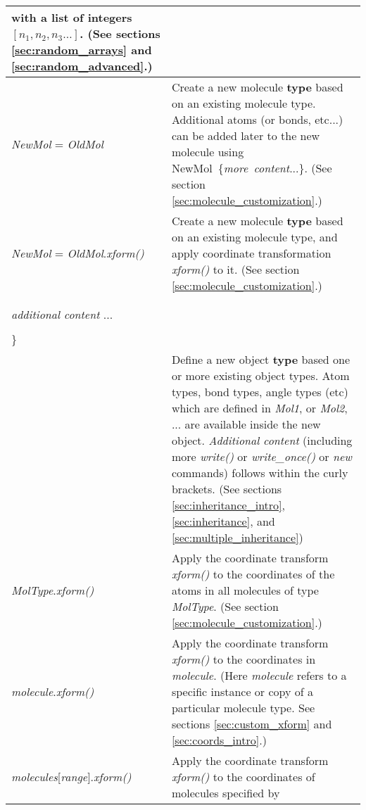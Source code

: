 \documentclass[11pt]{article}
\begin{document}
\begin{longtable}[h]{l|p{9cm}}
with a list of integers \mbox{$[n_1, n_2, n_3\ldots]$}.
(See sections \ref{sec:random_arrays} and \ref{sec:random_advanced}.)
\\
\hline
\textit{NewMol} = \textit{OldMol} &
Create a new molecule \textbf{type} based on an existing molecule type.
Additional atoms (or bonds, etc...) can be added later to the new molecule 
using \mbox{NewMol \{\textit{more\ content}...\}}.  
(See section \ref{sec:molecule_customization}.)
\\
\hline
\textit{NewMol} = \textit{OldMol}.\textit{xform()}
&
Create a new molecule \textbf{type} based on an existing molecule type,
and apply coordinate transformation \textit{xform()} to it.
(See section \ref{sec:molecule_customization}.)
\\
\hline
\begin{tabular}[t]{l}
\textit{NewMol} \textbf{inherits} \textit{Mol1} \textit{Mol2} ... \{ \\
\\
\hspace{0.35cm} \textit{additional content} ... \\
\\
\} \\
\end{tabular}
&
Define a new object \textbf{type}
based one or more existing object types.
Atom types, bond types, angle types (etc) which are defined in
\textit{Mol1}, or \textit{Mol2}, ... are available inside the
new object.
\textit{Additional content} 
(including more \textit{write()} or \textit{write\_once()}
or \textit{new} commands)
follows within the curly brackets.
(See sections \ref{sec:inheritance_intro},
\ref{sec:inheritance}, and \ref{sec:multiple_inheritance})
\\
\hline
\textit{MolType}.\textit{xform()}
&
Apply the coordinate transform \textit{xform()} to the coordinates 
of the atoms in all molecules of type \textit{MolType}.
(See section \ref{sec:molecule_customization}.)
\\
\hline
\textit{molecule}.\textit{xform()}
&
Apply the coordinate transform \textit{xform()} 
to the coordinates in \textit{molecule}.
(Here \textit{molecule} refers to a specific instance or copy of
 a particular molecule type.
See sections \ref{sec:custom_xform} and \ref{sec:coords_intro}.)
\\
\hline
\textit{molecules}[\textit{range}].\textit{xform()}
&
Apply the coordinate transform \textit{xform()} 
to the coordinates of molecules specified by

\end{longtable}
\end{document}
